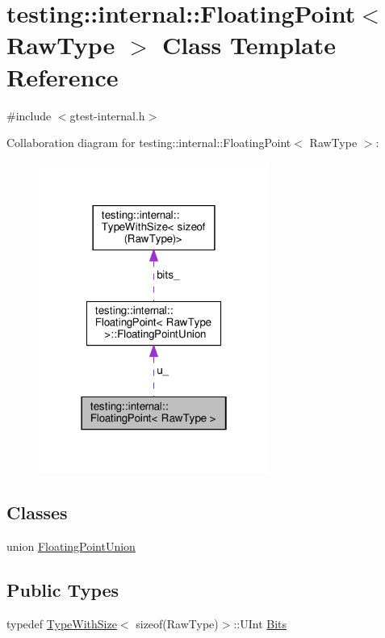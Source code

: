 \hypertarget{classtesting_1_1internal_1_1FloatingPoint}{}\section{testing\+:\+:internal\+:\+:Floating\+Point$<$ Raw\+Type $>$ Class Template Reference}
\label{classtesting_1_1internal_1_1FloatingPoint}


{\ttfamily \#include $<$gtest-\/internal.\+h$>$}



Collaboration diagram for testing\+:\+:internal\+:\+:Floating\+Point$<$ Raw\+Type $>$\+:\nopagebreak
\begin{figure}[H]
\begin{center}
\leavevmode
\includegraphics[width=214pt]{classtesting_1_1internal_1_1FloatingPoint__coll__graph}
\end{center}
\end{figure}
\subsection*{Classes}
\begin{DoxyCompactItemize}
\item 
union \hyperlink{uniontesting_1_1internal_1_1FloatingPoint_1_1FloatingPointUnion}{Floating\+Point\+Union}
\end{DoxyCompactItemize}
\subsection*{Public Types}
\begin{DoxyCompactItemize}
\item 
typedef \hyperlink{classtesting_1_1internal_1_1TypeWithSize}{Type\+With\+Size}$<$ sizeof(Raw\+Type)$>$\+::U\+Int \hyperlink{classtesting_1_1internal_1_1FloatingPoint_abf228bf6cd48f12c8b44c85b4971a731}{Bits}
\end{DoxyCompactItemize}
